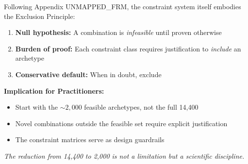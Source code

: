 \begin{tcolorbox}[colback=red!5!white, colframe=red!75!black,
    title=\textbf{Methodological Note: XVIII Exclusion Principle for Reduction}]

Following Appendix UNMAPPED_FRM, the constraint system itself embodies the Exclusion Principle:

\begin{enumerate}[nosep]
    \item \textbf{Null hypothesis:} A combination is \textit{infeasible} until proven otherwise
    \item \textbf{Burden of proof:} Each constraint class requires justification to \textit{include} an archetype
    \item \textbf{Conservative default:} When in doubt, exclude
\end{enumerate}

\textbf{Implication for Practitioners:}
\begin{itemize}[nosep]
    \item Start with the $\sim 2{,}000$ feasible archetypes, not the full 14,400
    \item Novel combinations outside the feasible set require explicit justification
    \item The constraint matrices serve as design guardrails
\end{itemize}

\textit{The reduction from 14,400 to 2,000 is not a limitation but a scientific discipline.}
\end{tcolorbox}

